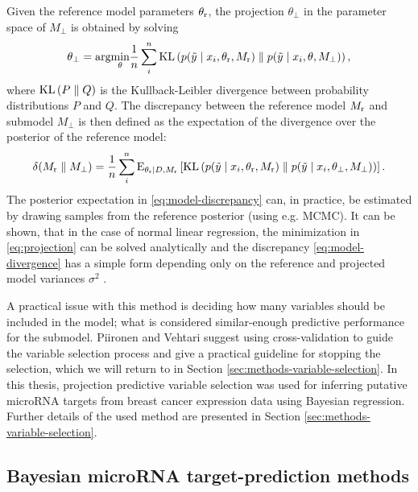 Given the reference model parameters $\theta_{\textup{r}}$, the projection $\theta_\perp$
in the parameter space of $M_\perp$ is obtained by solving
\begin{equation}
  \label{eq:projection}
  \theta_\perp = \textup{arg}\underset{\theta}{\textup{min}} \frac{1}{n}\sum_i^n \textup{KL} \left ( p(\tilde{y} \mid x_i, \theta_{\textup{r}}, M_{\textup{r}}) \parallel p(\tilde{y} \mid x_i, \theta, M_\perp) \right ),
\end{equation}
where $\textup{KL} \left ( P \parallel Q \right )$ is the Kullback-Leibler divergence
between probability distributions $P$ and $Q$. The discrepancy between the reference
model  $M_{\textup{r}}$ and submodel $M_\perp$ is then defined as the expectation
of the divergence over the posterior of the reference model:
\begin{equation}
  \label{eq:model-discrepancy}
  \delta(M_{\textup{r}} \parallel M_\perp) = \frac{1}{n} \sum_i^n \textup{E}_{\theta_{\textup{r}} \mid D,M_\textup{r}} \left [ \textup{KL} \left ( p(\tilde{y} \mid x_i, \theta_{\textup{r}}, M_{\textup{r}}) \parallel p(\tilde{y} \mid x_i, \theta_\perp, M_\perp) \right ) \right ].
\end{equation}
The posterior expectation in \eqref{eq:model-discrepancy} can, in practice, be
estimated by drawing samples from the reference posterior (using e.g. MCMC).
It can be shown, that in the case of normal linear regression, the
minimization in \eqref{eq:projection} can be solved analytically and the
discrepancy \eqref{eq:model-divergence} has a simple form depending only on
the reference and projected model variances $\sigma^2$ \citep{Piironen2015}.

A practical issue with this method is deciding how many variables should be included
in the model; what is considered similar-enough predictive performance
for the submodel. Piironen and Vehtari suggest using cross-validation
to guide the variable selection process and give a practical guideline
for stopping the selection, which we will return to in Section \ref{sec:methods-variable-selection}.
In this thesis, projection predictive variable selection was used for
inferring putative microRNA targets from breast cancer expression
data using Bayesian regression. Further details of the used method are
presented in Section \ref{sec:methods-variable-selection}.




\subsection{Bayesian microRNA target-prediction methods}

